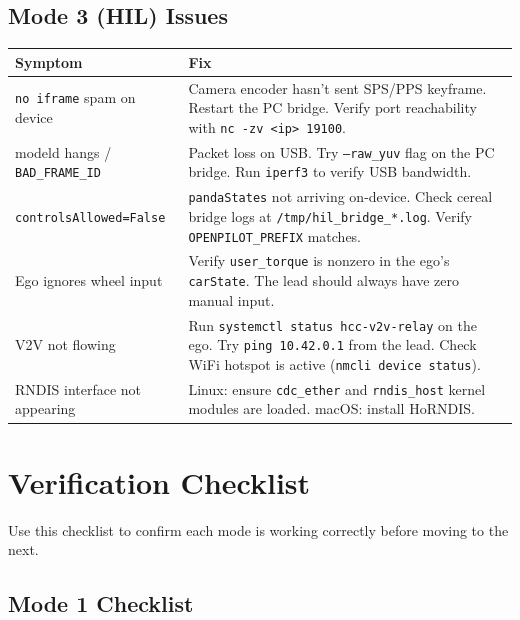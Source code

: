 \documentclass[11pt, letterpaper]{article}
\begin{document}
\subsection{Mode 3 (HIL) Issues}

\begin{center}
\begin{tabular}{@{}p{5cm}p{9cm}@{}}
\toprule
\textbf{Symptom} & \textbf{Fix} \\
\midrule
\texttt{no iframe} spam on device &
  Camera encoder hasn't sent SPS/PPS keyframe. Restart the PC bridge.
  Verify port reachability with \texttt{nc -zv <ip> 19100}. \\
modeld hangs / \texttt{BAD\_FRAME\_ID} &
  Packet loss on USB. Try \texttt{--raw\_yuv} flag on the PC bridge.
  Run \texttt{iperf3} to verify USB bandwidth. \\
\texttt{controlsAllowed=False} &
  \texttt{pandaStates} not arriving on-device. Check cereal bridge logs
  at \texttt{/tmp/hil\_bridge\_*.log}. Verify
  \texttt{OPENPILOT\_PREFIX} matches. \\
Ego ignores wheel input &
  Verify \texttt{user\_torque} is nonzero in the ego's
  \texttt{carState}. The lead should always have zero manual input. \\
V2V not flowing &
  Run \texttt{systemctl status hcc-v2v-relay} on the ego. Try
  \texttt{ping 10.42.0.1} from the lead. Check WiFi hotspot is active
  (\texttt{nmcli device status}). \\
RNDIS interface not appearing &
  Linux: ensure \texttt{cdc\_ether} and \texttt{rndis\_host} kernel
  modules are loaded. macOS: install HoRNDIS. \\
\bottomrule
\end{tabular}
\end{center}


\section{Verification Checklist}
\label{sec:verification}

Use this checklist to confirm each mode is working correctly before
moving to the next.

\subsection{Mode 1 Checklist}
\end{document}
